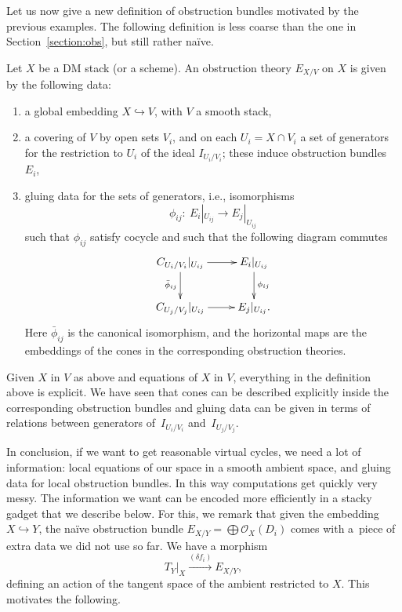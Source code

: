 \documentclass[pdftex]{sigma}
\numberwithin{equation}{section}
\begin{document}
 Let us now give a new definition of obstruction bundles motivated by the previous examples. The following definition is less coarse than the one in Section~\ref{section:obs}, but still rather na\"ive.
 \begin{Definition}\label{obs: less coarse}Let $X$ be a DM stack (or a scheme). An obstruction theory $E_{X/V}$ on $X$ is given by the following data:
\begin{enumerate}\itemsep=0pt
\item[1)] a global embedding $X\hookrightarrow V$, with $V$ a smooth stack,
\item[2)] a covering of $V$ by open sets $V_i$, and on each $U_i=X\cap V_i$ a set of generators for the restriction to $U_i$ of the ideal $I_{U_i/V_i}$; these induce obstruction bundles~$E_i$,
\item[3)] gluing data for the sets of generators, i.e., isomorphisms
\[\phi_{ij}\colon \ E_i|_{U_{ij}}\to E_j|_{U_{ij}}
\]
such that $\phi_{ij}$ satisfy cocycle and such that the following diagram commutes
\[\xymatrix{C_{U_i/V_i}|_{U_{ij}}\ar[r]\ar[d]_{\bar{\phi}_{ij}}&E_i|_{U_{ij}}\ar[d]^{\phi_{ij}}\\
C_{U_j/V_j}|_{U_{ij}}\ar[r]&E_j|_{U_{ij}}.}
\]
Here $\bar{\phi}_{ij}$ is the canonical isomorphism, and the horizontal maps are the embeddings of the cones in the corresponding obstruction theories.
\end{enumerate}

 \end{Definition}
\begin{Remark} Given $X$ in $V$ as above and equations of $X$ in $V$, everything in the definition above is explicit. We have seen that cones can be described explicitly inside the corresponding obstruction bundles and gluing data can be given in terms of relations between generators of~$I_{U_i/V_i}$ and~$I_{U_j/V_j}$.
\end{Remark}
In conclusion, if we want to get reasonable virtual cycles, we need a lot of information: local equations of our space in a smooth ambient space, and gluing data for local obstruction bundles. In this way computations get quickly very messy. The information we want can be encoded more efficiently in a stacky gadget that we describe below. For this, we remark that given the embedding $X\hookrightarrow Y$, the na\"ive obstruction bundle $E_{X/Y}=\bigoplus \mathcal O_X(D_i)$ comes with a~piece of extra data we did not use so far. We have a morphism
\begin{equation}\label{action}T_Y\rvert_X\xrightarrow{(\delta f_i)} E_{X/Y},
\end{equation}
defining an action of the tangent space of the ambient restricted to $X$. This motivates the following.
\end{document}
